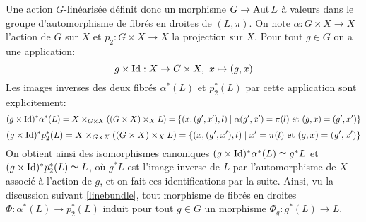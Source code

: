 Une action $G$-linéarisée définit donc un morphisme $G\rightarrow \operatorname{Aut} L$ à valeurs dans le groupe d'automorphisme de fibrés en droites de $(L,\pi)$. On note $\alpha: G\times X\rightarrow X$ l'action de $G$ sur $X$ et $p_2:G\times X\rightarrow X$ la projection sur $X$. Pour tout $g\in G$ on a une application:
$$g\times \mathrm{Id}: X\rightarrow G\times X,\,\, x\mapsto (g,x)$$ 
Les images inverses des deux fibrés $\alpha^*(L)$ et $p_2^*(L)$ par cette application sont explicitement: 
$$(g\times \mathrm{Id})^*\alpha^*(L)=X\times_{G\times X}((G\times X)\times_X L)=\lbrace (x,(g',x'),l)\mid \alpha(g',x')=\pi(l)\text{ et } (g,x)=(g',x')\rbrace$$
$$(g\times \mathrm{Id})^*p_2^*(L)=X\times_{G\times X}((G\times X)\times_X L)=\lbrace (x,(g',x'),l)\mid x'=\pi(l)\text{ et } (g,x)=(g',x')\rbrace$$
On obtient ainsi des isomorphismes canoniques $(g\times \mathrm{Id})^*\alpha^*(L)\simeq g^*L$ et $(g\times \mathrm{Id})^*p_2^*(L)\simeq L$, où $g^*L$ est l'image inverse de $L$ par l'automorphisme de $X$ associé à l'action de $g$, et on fait ces identifications par la suite. Ainsi, vu la discussion suivant \ref{linebundle}, tout morphisme de fibrés en droites $\Phi: \alpha^*(L)\rightarrow p_2^*(L)$ induit pour tout $g\in G$ un morphisme $\Phi_g:g^*(L)\rightarrow L$.

